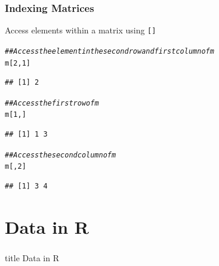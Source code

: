 \documentclass{beamer}\usepackage[]{graphicx}\usepackage[]{xcolor}
\makeatletter
\newcommand{\hlnum}[1]{\textcolor[rgb]{0.686,0.059,0.569}{#1}}%
\newcommand{\hlcom}[1]{\textcolor[rgb]{0.678,0.584,0.686}{\textit{#1}}}%
\newcommand{\hlstd}[1]{\textcolor[rgb]{0.345,0.345,0.345}{#1}}%
\newenvironment{kframe}{%
 \def\at@end@of@kframe{}%
 \ifinner\ifhmode%
  \def\at@end@of@kframe{\end{minipage}}%
  \begin{minipage}{\columnwidth}%
 \fi\fi%
 \def\FrameCommand##1{\hskip\@totalleftmargin \hskip-\fboxsep
 \colorbox{shadecolor}{##1}\hskip-\fboxsep
     \hskip-\linewidth \hskip-\@totalleftmargin \hskip\columnwidth}%
 \MakeFramed {\advance\hsize-\width
   \@totalleftmargin\z@ \linewidth\hsize
   \@setminipage}}%
 {\par\unskip\endMakeFramed%
 \at@end@of@kframe}
\newenvironment{knitrout}{}{} %
\makeatother
\begin{document}
\begin{frame}[fragile]\frametitle{Indexing Matrices}
    Access elements within a matrix using \texttt{[]}
\begin{knitrout}\footnotesize
{}\color{fgcolor}\begin{kframe}
\begin{alltt}
\hlcom{## Access the element in the second row and first column of m}
\hlstd{m[}\hlnum{2}\hlstd{,} \hlnum{1}\hlstd{]}
\end{alltt}
\begin{verbatim}
## [1] 2
\end{verbatim}
\begin{alltt}
\hlcom{## Access the first row of m}
\hlstd{m[}\hlnum{1}\hlstd{, ]}
\end{alltt}
\begin{verbatim}
## [1] 1 3
\end{verbatim}
\begin{alltt}
\hlcom{## Access the second column of m}
\hlstd{m[,} \hlnum{2}\hlstd{]}
\end{alltt}
\begin{verbatim}
## [1] 3 4
\end{verbatim}
\end{kframe}
\end{knitrout}
\end{frame}

\section{Data in R}
\label{data}
\begin{frame}\frametitle{}
    \vfill
    \centering
    \begin{beamercolorbox}[center]{title}
        \Large Data in R
    \end{beamercolorbox}
    \vfill
\end{frame}
\end{document}
